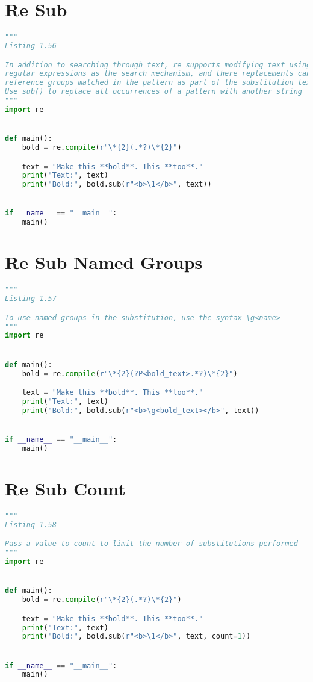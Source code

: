 \documentclass[a4paper,landscape]{report}
\begin{document}
\section{Re Sub}
\begin{lstlisting}[language=Python]
"""
Listing 1.56

In addition to searching through text, re supports modifying text using
regular expressions as the search mechanism, and there replacements can
reference groups matched in the pattern as part of the substitution text.
Use sub() to replace all occurrences of a pattern with another string
"""
import re


def main():
    bold = re.compile(r"\*{2}(.*?)\*{2}")

    text = "Make this **bold**. This **too**."
    print("Text:", text)
    print("Bold:", bold.sub(r"<b>\1</b>", text))


if __name__ == "__main__":
    main()

\end{lstlisting}
\section{Re Sub Named Groups}
\begin{lstlisting}[language=Python]
"""
Listing 1.57

To use named groups in the substitution, use the syntax \g<name>
"""
import re


def main():
    bold = re.compile(r"\*{2}(?P<bold_text>.*?)\*{2}")

    text = "Make this **bold**. This **too**."
    print("Text:", text)
    print("Bold:", bold.sub(r"<b>\g<bold_text></b>", text))


if __name__ == "__main__":
    main()

\end{lstlisting}
\section{Re Sub Count}
\begin{lstlisting}[language=Python]
"""
Listing 1.58

Pass a value to count to limit the number of substitutions performed
"""
import re


def main():
    bold = re.compile(r"\*{2}(.*?)\*{2}")

    text = "Make this **bold**. This **too**."
    print("Text:", text)
    print("Bold:", bold.sub(r"<b>\1</b>", text, count=1))


if __name__ == "__main__":
    main()

\end{lstlisting}
\end{document}
